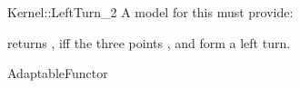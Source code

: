 \begin{ccRefFunctionObjectConcept}{Kernel::LeftTurn_2}
A model for this must provide:


{returns , iff the three points ,  
and  form a left turn.}

\ccRefines
AdaptableFunctor

\ccSeeAlso
{}\\

\end{ccRefFunctionObjectConcept}
